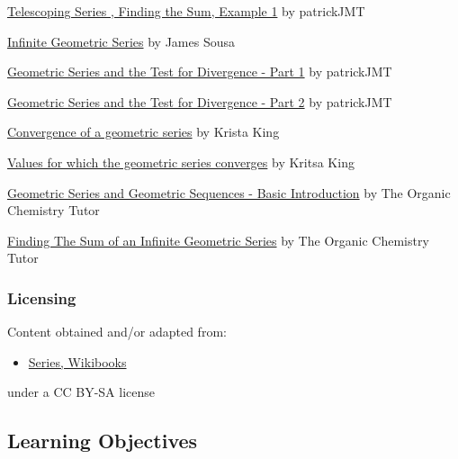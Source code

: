 \href{https://youtu.be/H8HVYiEqzBo}{Telescoping Series , Finding the Sum, Example 1} by patrickJMT


\href{https://youtu.be/pFcJZnxqzNc}{Infinite Geometric Series} by James Sousa


\href{https://youtu.be/xjmy5hkZccY}{Geometric Series and the Test for Divergence - Part 1} by patrickJMT


\href{https://youtu.be/C8piSCOdo1Y}{Geometric Series and the Test for Divergence - Part 2} by patrickJMT


\href{https://youtu.be/LhO7i3RFri0}{Convergence of a geometric series} by Krista King


\href{https://youtu.be/1eInMsp20cI}{Values for which the geometric series converges} by Kritsa King


\href{https://youtu.be/-5kIBPR2Npk}{Geometric Series and Geometric Sequences - Basic Introduction} by The Organic Chemistry Tutor


\href{https://youtu.be/jxRqRLMliPc}{Finding The Sum of an Infinite Geometric Series} by The Organic Chemistry Tutor


\subsubsection{Licensing}
\label{sss:lice-7352}


Content obtained and/or adapted from:


\begin{itemize}
    \item \href{https://en.wikibooks.org/wiki/User:Dcljr/Series}{Series, Wikibooks}
\end{itemize}
    under a CC BY-SA license

\subsection{Learning Objectives}

